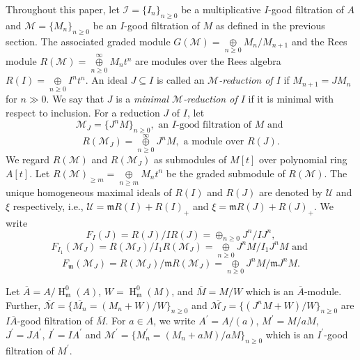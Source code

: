 \documentclass[10pt,a4paper]{amsart}
\def\I{{\mathcal I}}
\def\M{{\mathcal M}}
\DeclareMathOperator{\h}{H}
\newcommand{\m}{\mathfrak m}
\def\U{{\mathcal U}}
\begin{document}
    
    Throughout this paper, let $\I=\{I_n\}_{n\geq 0}$ be a multiplicative $I$-good filtration of $A$ and $\M=\{M_n\}_{n\geq 0}$ be an $I$-good filtration of $M$ as defined in the previous section. The associated graded module $G(\M)=\mathop{\oplus}\limits_{n\geq 0} M_n/M_{n+1}$ and the Rees module $R(\M)=\mathop{\oplus}\limits_{n\geq 0}^\infty M_nt^n$ are modules over the Rees algebra $R(I)=\mathop{\oplus}\limits_{n\geq 0} I^nt^n$. An ideal $J\subseteq I$ is called an {\em $\M$-reduction of $I$} if $M_{n+1}=JM_{n}$ for $n\gg 0.$ We say that $J$ is a {\em minimal $\M$-reduction of $I$} if it is minimal with respect to inclusion. For a reduction $J$ of $I$, let $$\M_J=\{J^nM\}_{n\geq 0},\text{ an $I$-good filtration of $M$ and }$$  $$R(\M_J)= \mathop{\oplus}\limits_{n\geq 0}^\infty J^nM, \text{ a module over } R(J).$$ 
We regard $R(\M)$ and $R(\M_J)$ as submodules of $M[t]$ over polynomial ring $A[t].$ Let $R(\M)_{\geq m}=\mathop{\oplus}\limits_{n\geq m}M_nt^n$ be the graded submodule of $R(\M).$ The unique homogeneous maximal ideals of $R(I)$ and $R(J)$ are denoted by $\U$ and $\xi$ respectively, i.e., $\U=\m R(I)+R(I)_+$ and $\xi = \m R(J)+R(J)_+.$ We write $$F_I(J)=R(J)/IR(J)=\mathop{\oplus}_{n\geq 0} J^n/IJ^n,$$ $$F_{I_1}(\M_J)=R(\M_J)/I_1R(\M_J)=\mathop{\oplus}\limits_{n\geq 0}J^nM/I_1J^nM \text{ and }$$ $$F_\m(\M_J)=R(\M_J)/\m R(\M_J)=\mathop{\oplus}\limits_{n\geq 0}J^nM/\m J^nM.$$


Let $\overline{A}=A/\h_{\m}^0(A)$, $W=\h_{\m}^0(M)$, and $\overline{M}=M/W$ which is an $\overline{A}$-module. Further, $\overline{\M}=\{ \overline{M_n}=(M_n+W)/W\}_{n\geq 0}$ and $\overline{\M_J}=\{(J^nM+W)/W\}_{n\geq 0}$  are $I\overline{A}$-good filtration of $\overline{M}$.
For  $a\in A$, we write $A^\prime=A/(a)$, $M^\prime=M/aM$, $J^\prime=JA^\prime$, $I^\prime=IA^\prime$ and  $\M^\prime=\{M_n^\prime=(M_n+aM)/aM\}_{n\geq 0}$ which is an $I^\prime$-good filtration of $M^\prime$.  
\end{document}
